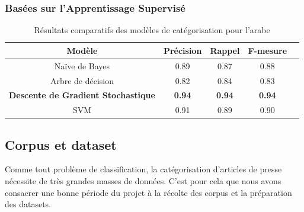         \subsubsection{Basées sur l'Apprentissage Supervisé}
            \begin{table}[H]
                    \begin{center}
                        \begin{tabular}{|c|c|c|c|c}
                            \hline
                            \textbf{Modèle} & \textbf{Précision} & \textbf{Rappel} & \textbf{F-mesure} \\
                            \hline
                            Naïve de Bayes & 0.89 & 0.87 & 0.88 \\
                            Arbre de décision & 0.82 & 0.84 & 0.83 \\
                            \textbf{Descente de Gradient Stochastique} & \textbf{0.94} & \textbf{0.94} & \textbf{0.94} \\
                            SVM & 0.91 & 0.89 & 0.90 \\
                            \hline
                        \end{tabular}
                    \end{center}
                    \caption{Résultats comparatifs des modèles de catégorisation pour l'arabe}
                    \label{modele-categ}
                \end{table}
                
    \subsection{Corpus et dataset}
        Comme tout problème de classification, la catégorisation d'articles de presse nécessite de très grandes masses de données. C'est pour cela que nous avons consacrer une bonne période du projet à la récolte des corpus et la préparation des datasets.     
